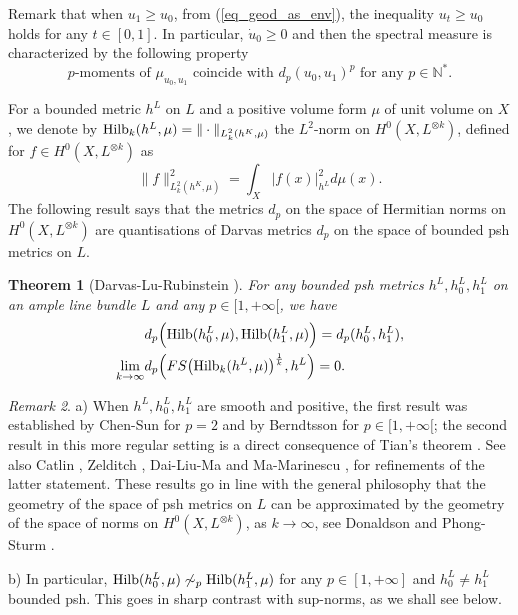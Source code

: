 \documentclass[12pt]{article}
\numberwithin{equation}{section}
\theoremstyle{theorem}
\newtheorem{thm}{Theorem}[section]
\theoremstyle{definition}
\theoremstyle{remark}
\newtheorem{rem}[thm]{Remark}
\newcommand{\nat}{\mathbb{N}}
\begin{document}
	\par 
	Remark that when $u_1 \geq u_0$, from (\ref{eq_geod_as_env}), the inequality $u_t \geq u_0$ holds for any $t \in [0, 1]$.
	In particular, $\dot{u}_0 \geq 0$ and then the spectral measure is characterized by the following property 
	\begin{equation}\label{eq_char_spec_meas}
		 \text{$p$-moments of $\mu_{u_0, u_1}$ coincide with $d_p(u_0, u_1)^p$ for any $p \in \nat^*$.}
	\end{equation}
	\par 
	For a bounded metric $h^L$ on $L$ and a positive volume form $\mu$ of unit volume on $X$, we denote by ${\rm{Hilb}}_k(h^L, \mu) = \| \cdot \|_{L^2_k(h^K, \mu)}$ the $L^2$-norm on $H^0(X, L^{\otimes k})$, defined for $f \in H^0(X, L^{\otimes k})$ as
	\begin{equation}\label{eq_hilb_defn}
		 \| f \|_{L^2_k(h^K, \mu)}^2
		 =
		 \int_X |f(x)|_{h^L}^2 d \mu(x).
	\end{equation}
	The following result says that the metrics $d_p$ on the space of Hermitian norms on $H^0(X, L^{\otimes k})$ are quantisations of Darvas metrics $d_p$ on the space of bounded psh metrics on $L$.
	\begin{thm}[{Darvas-Lu-Rubinstein \cite[Theorem 1.2]{DarvLuRub}}]\label{thm_darvlurub_quant}
		For any bounded psh metrics $h^L, h^L_0, h^L_1$ on an ample line bundle $L$ and any $p \in [1, +\infty[$, we have
		\begin{equation}
		\begin{aligned}
			&
			d_p \Big( {\rm{Hilb}}(h^L_0, \mu), {\rm{Hilb}}(h^L_1, \mu) \Big)
			=
			d_p(h^L_0, h^L_1),
			\\
			\lim_{k \to \infty} & d_p \Big( FS \big( {\rm{Hilb}}_k(h^L, \mu) \big)^{\frac{1}{k}}, h^L \Big) = 0.
		\end{aligned}
		\end{equation}
	\end{thm}
	\begin{rem}
		a) When $h^L, h^L_0, h^L_1$  are smooth and positive, the first result was established by Chen-Sun \cite{ChenSunQuant} for $p = 2$ and by Berndtsson \cite{BerndtProb} for $p \in [1, +\infty[$; the second result in this more regular setting is a direct consequence of Tian's theorem \cite{TianBerg}. See also Catlin \cite{Caltin}, Zelditch \cite{ZeldBerg}, Dai-Liu-Ma \cite{DaiLiuMa} and Ma-Marinescu \cite{MaHol}, for refinements of the latter statement.
		These results go in line with the general philosophy that the geometry of the space of psh metrics on $L$ can be approximated by the geometry of the space of norms on $H^0(X, L^{\otimes k})$, as $k \to \infty$, see Donaldson \cite{DonaldSymSp} and Phong-Sturm \cite{PhongSturm}.
		\par
		b) In particular, ${\rm{Hilb}}(h^L_0, \mu) \not\sim_p {\rm{Hilb}}(h^L_1, \mu)$ for any $p \in [1, +\infty]$ and $h^L_0 \neq h^L_1$ bounded psh.
		This goes in sharp contrast with sup-norms, as we shall see below.
	\end{rem}
\end{document}
